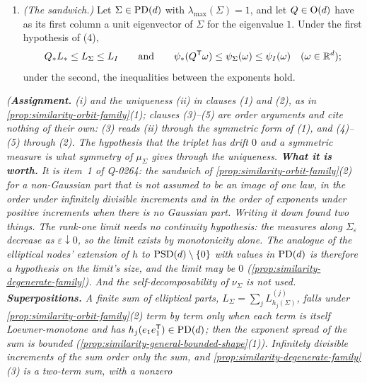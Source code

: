 \begin{proposition}
\begin{enumerate}
$\psi_*(\omega) := \lim_{\varepsilon\downarrow0}\psi_{\Sigma_\varepsilon}(\omega)$ exists for every
$\omega$. Both are invariant under every $R \in \Orth(d)$ with $Re_1 = \pm e_1$. If instead
$C \equiv 0$ and every Loewner step has a positive finite increment, $\psi_*$ exists and has the same
invariance.
\item \emph{(The sandwich.)} Let $\Sigma \in \mathrm{PD}(d)$ with $\lambda_{\max}(\Sigma) = 1$, and let
$Q \in \mathrm{O}(d)$ have as its first column a unit eigenvector of $\Sigma$ for the eigenvalue $1$. Under
the first hypothesis of (4),
\[
  Q_*L_* \le L_\Sigma \le L_I
  \qquad\text{and}\qquad
  \psi_*(Q^{\mathsf{T}}\omega) \le \psi_\Sigma(\omega) \le \psi_I(\omega) \quad (\omega \in \mathbb{R}^d) ;
\]
under the second, the inequalities between the exponents hold.
\end{enumerate}
\statusA\quad{}\quad\emph{(\textbf{Assignment.} (i) and the uniqueness (ii) in
clauses (1) and (2), as in \ref{prop:similarity-orbit-family}(1); clauses (3)--(5) are order
arguments and cite nothing of their own: (3) reads (ii) through the symmetric form of (1),
and (4)--(5) through (2). The hypothesis that the triplet has drift $0$ and a symmetric \Levy{}
measure is what symmetry of $\mu_\Sigma$ gives through the uniqueness. \textbf{What it is worth.} It is
item~1 of Q-0264: the sandwich of \ref{prop:similarity-orbit-family}(2) for a non-Gaussian part
that is not assumed to be an image of one law, in the \Levy{} order under infinitely divisible
increments and in the order of exponents under positive increments when there is no Gaussian part.
Writing it down found two things. The rank-one limit needs no continuity hypothesis: the \Levy{}
measures along $\Sigma_\varepsilon$ decrease as $\varepsilon \downarrow 0$, so the limit exists by
monotonicity alone. The analogue of the elliptical nodes' extension of $h$ to
$\mathrm{PSD}(d) \setminus \{0\}$ with values in $\mathrm{PD}(d)$ is therefore a hypothesis on the limit's
\emph{size}, and the limit may be $0$ (\ref{prop:similarity-degenerate-family}). And the
self-decomposability of $\nu_\Sigma$ is not used. \textbf{Superpositions.} A finite sum of elliptical
parts, $L_\Sigma = \sum_jL^{(j)}_{h_j(\Sigma)}$, falls under \ref{prop:similarity-orbit-family}(2)
term by term only when each term is itself Loewner-monotone and has $h_j(e_1e_1^{\mathsf{T}}) \in \mathrm{PD}(d)$;
then the exponent spread of the sum is bounded
(\ref{prop:similarity-general-bounded-shape}(1)). Infinitely divisible increments of the sum order
only the sum, and \ref{prop:similarity-degenerate-family}(3) is a two-term sum, with a nonzero
}
\end{proposition}
